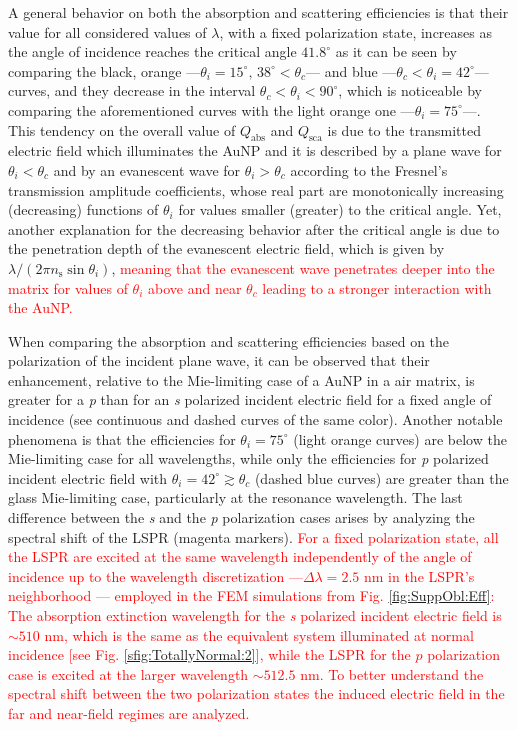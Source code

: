 A general behavior on both the absorption and scattering efficiencies is that their value for all considered values of $\lambda$, with a fixed polarization state, increases as the angle of incidence reaches the critical angle $41.8^\circ$ as it can be seen by comparing the black, orange ---$\theta_i = 15^\circ,\, 38^\circ < \theta_c$---  and blue ---$\theta_c<\theta_i = 42^\circ$--- curves, and they decrease in the interval  $\theta_c<\theta_i<90^\circ$, which is noticeable by comparing the aforementioned curves with the light orange one ---$\theta_i = 75^\circ$---. This tendency on the overall value of $Q_\text{abs}$ and $Q_\text{sca}$ is due to the transmitted electric field which illuminates the AuNP and it is described by a plane wave for $\theta_i<\theta_c$ and by an evanescent wave for $\theta_i>\theta_c$ according to the Fresnel's transmission amplitude coefficients, whose real part are monotonically increasing (decreasing) functions of $\theta_i$ for values smaller (greater) to the critical angle. Yet, another explanation for the decreasing behavior after the critical angle is due to the penetration depth of the evanescent electric field, which is given by $\lambda/(2\pi n_\text{s}\sin\theta_i)$, \textcolor{red}{meaning that the evanescent wave penetrates deeper into the matrix for values of $\theta_i$ above and near $\theta_c$ leading to a stronger interaction with the AuNP.}

When comparing the absorption and scattering efficiencies based on the polarization of the incident plane wave, it can be observed that their enhancement, relative to the Mie-limiting case of a AuNP in a air matrix, is greater for a  \textit{p} than for an \textit{s} polarized incident electric field for a fixed angle of incidence (see continuous and dashed curves of the same color). Another notable phenomena is that the  efficiencies for $\theta_i=75^\circ$ (light orange curves)  are below the Mie-limiting case for all wavelengths, while only the efficiencies for  \textit{p} polarized incident electric field with $\theta_i = 42^\circ \gtrsim \theta_c$ (dashed blue curves) are greater than the glass Mie-limiting case, particularly at the resonance wavelength. The last difference between the \textit{s} and the \textit{p} polarization cases arises by analyzing the spectral shift of the LSPR (magenta markers). \textcolor{red}{For a fixed polarization state, all the LSPR are excited at the same wavelength independently of the angle of incidence up to the wavelength discretization ---$\Delta \lambda = 2.5$ nm in the LSPR's neighborhood --- employed in the FEM simulations from Fig. \ref{fig:SuppObl:Eff}: The absorption extinction wavelength for the \textit{s} polarized incident electric field is $\sim 510$ nm, which is the same as the equivalent system illuminated at normal incidence [see Fig. \ref{sfig:TotallyNormal:2}], while the LSPR for the $p$ polarization case is excited at the larger wavelength $\sim 512.5$ nm. To better understand the spectral shift between the two polarization states the induced electric field in the far and near-field regimes are analyzed.}

